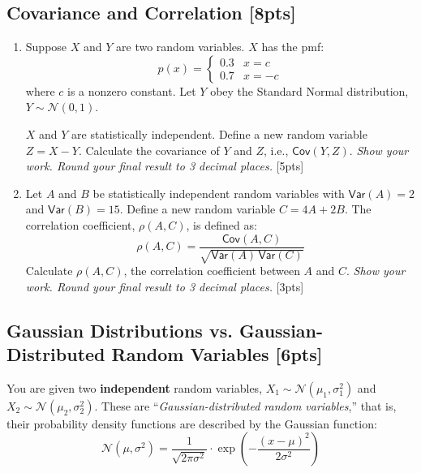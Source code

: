 \subsection{Covariance and Correlation [8pts]}
\begin{enumerate}[label=\alph*.]
    \item Suppose $X$ and $Y$ are two random variables. $X$ has the pmf:
    $$
    p(x) = \begin{cases} 0.3 & x = c \\ 0.7 & x = -c \end{cases}
    $$
    where $c$ is a nonzero constant. Let $Y$ obey the Standard Normal distribution, $Y \sim \mathcal{N}(0, 1)$.
    
    $X$ and $Y$ are statistically independent. Define a new random variable $Z = X - Y$. Calculate the covariance of $Y$ and $Z$, i.e., $\mathsf{Cov}(Y, Z)$. \emph{Show your work. Round your final result to 3 decimal places.} [5pts]

    \item Let $A$ and $B$ be statistically independent random variables with $\mathsf{Var}(A) = 2$ and $\mathsf{Var}(B) = 15$. Define a new random variable $C = 4A + 2B$. The correlation coefficient, $\rho(A, C)$, is defined as:
    $$
    \rho(A, C) = \frac{\mathsf{Cov}(A, C)}{\sqrt{\mathsf{Var}(A)\,\mathsf{Var}(C)}}
    $$
    Calculate $\rho(A, C)$, the correlation coefficient between $A$ and $C$. \emph{Show your work. Round your final result to 3 decimal places.} [3pts]
\end{enumerate}
\newpage



\subsection{Gaussian Distributions vs. Gaussian-Distributed Random Variables [6pts]}
You are given two \textbf{independent} random variables, $X_1 \sim \mathcal{N}(\mu_1, \sigma_1^2)$ and $X_2 \sim \mathcal{N}(\mu_2, \sigma_2^2)$.
These are ``\textit{Gaussian-distributed random variables},'' that is, their probability density functions are described by the Gaussian function:
$$\mathcal{N}(\mu, \sigma^2)=\frac{1}{\sqrt{2\pi\sigma^2}}\cdot \exp\left( -\frac{(x-\mu)^2}{2\sigma^2} \right)$$

